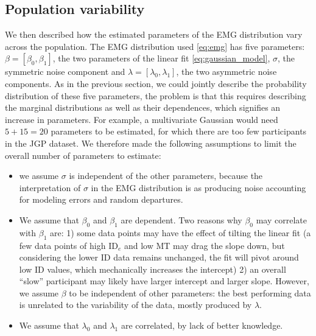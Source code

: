 \documentclass[12pt,a4paper]{article}
\newcommand{\ide}{\ensuremath{{\text{ID}_e}}\xspace}
\begin{document}

\subsection{Population variability}
We then described how the estimated parameters of the EMG distribution vary across the population. The EMG distribution used \autoref{eq:emg} has five parameters: $\beta = [\beta_0, \beta_1]$, the two parameters of the linear fit \autoref{eq:gaussian_model}, $\sigma$, the symmetric noise component and $\lambda = [\lambda_0, \lambda_1]$, the two asymmetric noise components. As in the previous section, we could jointly describe the probability distribution of these five parameters, the problem is that this requires describing the marginal distributions as well as their dependences, which signifies an increase in parameters. For example, a multivariate Gaussian would need $ 5 + 15 = 20$ parameters to be estimated, for which there are too few participants in the JGP dataset.
We therefore made the following assumptions to limit the overall number of parameters to estimate:
\begin{itemize}
	\item we assume $\sigma$ is independent of the other parameters, because the interpretation of $\sigma$ in the EMG distribution is as producing noise accounting for modeling errors and random departures.
	\item We assume that $\beta_0$ and $\beta_1$ are dependent. Two reasons why $\beta_0$ may correlate with $\beta_1$ are: 1) some data points may have the effect of tilting the linear fit (\eg a few data points of high \ide and low MT may drag the slope down, but considering the lower ID data remains unchanged, the fit will pivot around low ID values, which mechanically increases the intercept) 2) an overall ``slow'' participant may likely have larger intercept and larger slope. However, we assume $\beta$ to be independent of other parameters: the best performing data is unrelated to the variability of the data, mostly produced by $\lambda$.
	\item We assume that $\lambda_0$ and $\lambda_1$ are correlated, by lack of better knowledge.
\end{itemize}
\end{document}
